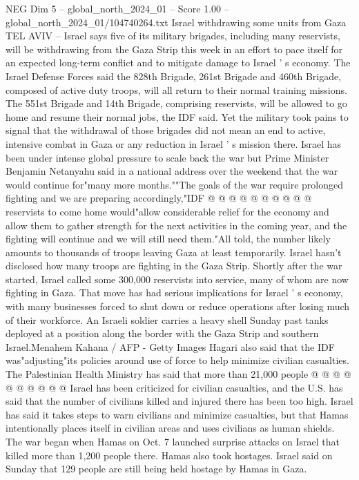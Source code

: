 \begin{textsample}{NEG Dim 5 – global\_north\_2024\_01 – Score 1.00 – global\_north\_2024\_01/104740264.txt}  \label{ex:f5_neg_319}
Israel withdrawing some units from Gaza TEL AVIV -- Israel says five of its military brigades, including many reservists, will be withdrawing from the Gaza Strip this week in an effort to pace itself for an expected long-term conflict and to mitigate damage to Israel ' s economy.
The Israel Defense Forces said the 828th Brigade, 261st Brigade and 460th Brigade, composed of active duty troops, will all return to their normal training missions.
The 551st Brigade and 14th Brigade, comprising reservists, will be allowed to go home and resume their normal jobs, the IDF said.
Yet the military took pains to signal that the withdrawal of those brigades did not mean an end to active, intensive combat in Gaza or any reduction in Israel ' s mission there.
Israel has been under intense global pressure to scale back the war but Prime Minister Benjamin Netanyahu said in a national address over the weekend that the war would continue for"many more months.""The goals of the war require prolonged fighting and we are preparing accordingly,"IDF @ @ @ @ @ @ @ @ @ @ reservists to come home would"allow considerable relief for the economy and allow them to gather strength for the next activities in the coming year, and the fighting will continue and we will still need them."All told, the number likely amounts to thousands of troops leaving Gaza at least temporarily.
Israel hasn't disclosed how many troops are fighting in the Gaza Strip.
Shortly after the war started, Israel called some 300,000 reservists into service, many of whom are now fighting in Gaza.
That move has had serious implications for Israel ' s economy, with many businesses forced to shut down or reduce operations after losing much of their workforce.
An Israeli soldier carries a heavy shell Sunday past tanks deployed at a position along the border with the Gaza Strip and southern Israel.Menahem Kahana / AFP - Getty Images Hagari also said that the IDF was"adjusting"its policies around use of force to help minimize civilian casualties.
The Palestinian Health Ministry has said that more than 21,000 people @ @ @ @ @ @ @ @ @ @ Israel has been criticized for civilian casualties, and the U.S. has said that the number of civilians killed and injured there has been too high.
Israel has said it takes steps to warn civilians and minimize casualties, but that Hamas intentionally places itself in civilian areas and uses civilians as human shields.
The war began when Hamas on Oct. 7 launched surprise attacks on Israel that killed more than 1,200 people there.
Hamas also took hostages.
Israel said on Sunday that 129 people are still being held hostage by Hamas in Gaza.

\end{textsample}
